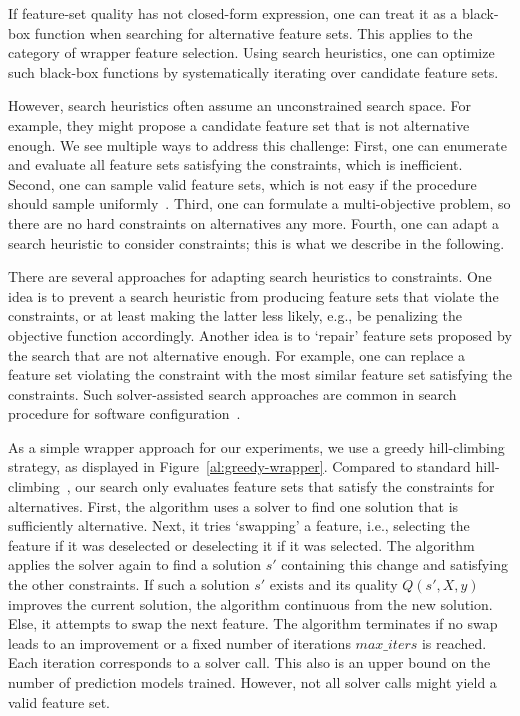 \documentclass[conference]{IEEEtran}
\theoremstyle{definition}
\begin{document}
If feature-set quality has not closed-form expression, one can treat it as a black-box function when searching for alternative feature sets.
This applies to the category of wrapper feature selection.
Using search heuristics, one can optimize such black-box functions by systematically iterating over candidate feature sets.

However, search heuristics often assume an unconstrained search space.
For example, they might propose a candidate feature set that is not alternative enough.
We see multiple ways to address this challenge:
First, one can enumerate and evaluate all feature sets satisfying the constraints, which is inefficient.
Second, one can sample valid feature sets, which is not easy if the procedure should sample uniformly~\cite{ermon2012uniform}.
Third, one can formulate a multi-objective problem, so there are no hard constraints on alternatives any more.
Fourth, one can adapt a search heuristic to consider constraints; this is what we describe in the following.

There are several approaches for adapting search heuristics to constraints.
One idea is to prevent a search heuristic from producing feature sets that violate the constraints, or at least making the latter less likely, e.g., be penalizing the objective function accordingly.
Another idea is to `repair' feature sets proposed by the search that are not alternative enough.
For example, one can replace a feature set violating the constraint with the most similar feature set satisfying the constraints.
Such solver-assisted search approaches are common in search procedure for software configuration~\cite{white2010automated,henard2015combining,guo2018preserve}.

As a simple wrapper approach for our experiments, we use a greedy hill-climbing strategy, as displayed in Figure~\ref{al:greedy-wrapper}.
Compared to standard hill-climbing~\cite{kohavi1997wrappers}, our search only evaluates feature sets that satisfy the constraints for alternatives.
First, the algorithm uses a solver to find one solution that is sufficiently alternative.
Next, it tries `swapping' a feature, i.e., selecting the feature if it was deselected or deselecting it if it was selected.
The algorithm applies the solver again to find a solution $s'$ containing this change and satisfying the other constraints.
If such a solution $s'$ exists and its quality $Q(s',X,y)$ improves the current solution, the algorithm continuous from the new solution.
Else, it attempts to swap the next feature.
The algorithm terminates if no swap leads to an improvement or a fixed number of iterations $max\_iters$ is reached.
Each iteration corresponds to a solver call.
This also is an upper bound on the number of prediction models trained.
However, not all solver calls might yield a valid feature set.
\end{document}
